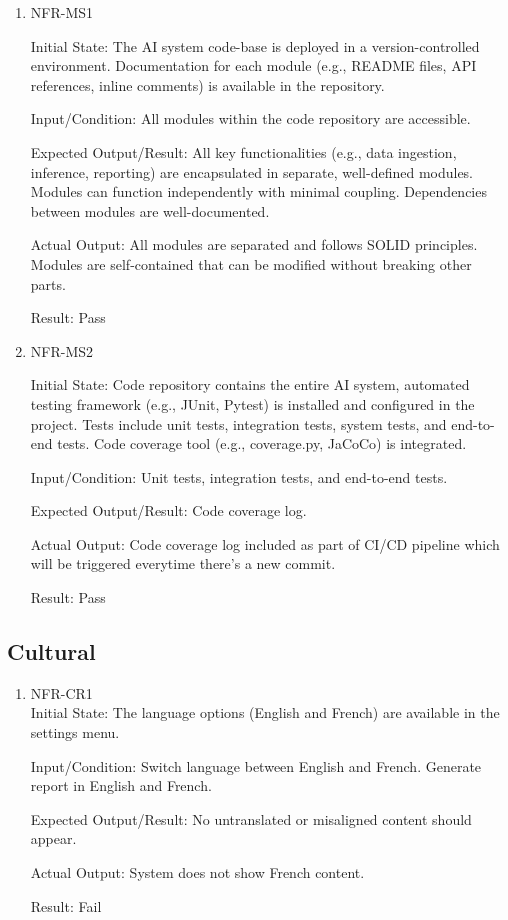 \documentclass[12pt, titlepage]{article}
\begin{document}
\begin{enumerate}

  \item{NFR-MS1\\}\label{NFR-MS1}

  Initial State: The AI system code-base is deployed in a version-controlled environment. Documentation for each module (e.g., README files, API references, inline comments) is available in the repository.

  Input/Condition: All modules within the code repository are accessible.

  Expected Output/Result: All key functionalities (e.g., data ingestion, inference, reporting) are encapsulated in separate, well-defined modules. Modules can function independently with minimal coupling. Dependencies between modules are well-documented.

  Actual Output: All modules are separated and follows SOLID principles. Modules are self-contained that can be modified without breaking other parts.

  Result: Pass

  \item{NFR-MS2\\}\label{NFR-MS2}

  Initial State: Code repository contains the entire AI system, automated testing framework (e.g., JUnit, Pytest) is installed and configured in the project. Tests include unit tests, integration tests, system tests, and end-to-end tests. Code coverage tool (e.g., coverage.py, JaCoCo) is integrated.

  Input/Condition: Unit tests, integration tests, and end-to-end tests.

  Expected Output/Result: Code coverage log.

  Actual Output: Code coverage log included as part of CI/CD pipeline which will be triggered everytime there's a new commit.

  Result: Pass

\end{enumerate}

\subsection{Cultural}
\begin{enumerate}
\item{NFR-CR1\\}\label{NFR-CR1}
Initial State: The language options (English and French) are available in the settings menu.

Input/Condition: Switch language between English and French. Generate report in English and French.

Expected Output/Result: No untranslated or misaligned content should appear.

Actual Output: System does not show French content.

Result: Fail 

\end{enumerate}
\end{document}
